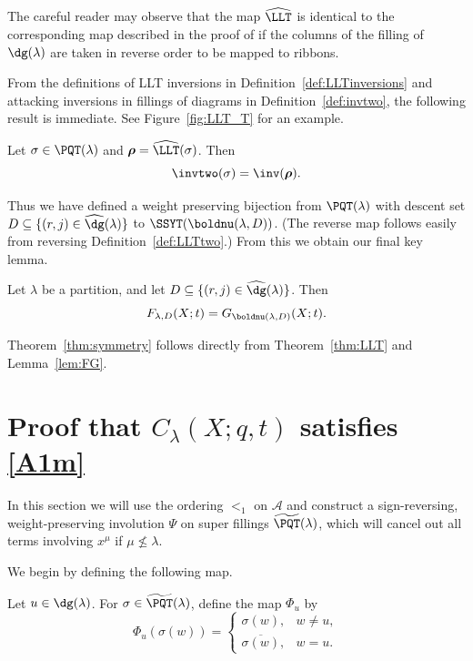 \begin{remark}
The careful reader may observe that the map $\widehat{\LLT}$ is identical to the corresponding map described in the proof of \cite[Proposition 3.4]{HHL05} if the columns of the filling of $\dg(\lambda)$ are taken in reverse order to be mapped to ribbons.
\end{remark}

From the definitions of LLT inversions in Definition~\ref{def:LLTinversions} and attacking inversions in fillings of diagrams in Definition~\ref{def:invtwo}, the following result is immediate. See Figure~\ref{fig:LLT_T} for an example.

\begin{lemma}\label{lem:LLTtwo}
Let $\sigma\in\PQT(\lambda)$ and $\boldsymbol{\rho}=\widehat{\LLT}(\sigma)$. Then
\[
\invtwo(\sigma) = \inv(\boldsymbol{\rho}).
\]
\end{lemma}


Thus we have defined a weight preserving bijection from $\PQT(\lambda)$ with descent set $D \subseteq \{(r,j) \in \widehat{\dg}(\lambda)\}$ to $\SSYT(\boldnu(\lambda,D))$. (The reverse map follows easily from reversing Definition~\ref{def:LLTtwo}.) From this we obtain our final key lemma.

\begin{lemma}\label{lem:FG}
Let $\lambda$ be a partition, and let $D \subseteq \{(r,j) \in \widehat{\dg}(\lambda)\}$. Then
\[
F_{\lambda,D}(X;t) = G_{\boldnu(\lambda,D)}(X;t).
\]
\end{lemma}

Theorem~\ref{thm:symmetry} follows directly from Theorem~\ref{thm:LLT} and Lemma~\ref{lem:FG}.







\section{Proof that $C_{\lambda}(X;q,t)$ satisfies \eqref{A1m}}
\label{sec:A1m}

In this section we will use the ordering $<_1$ on $\mathcal{A}$ and construct a sign-reversing, weight-preserving involution $\Psi$ on super fillings $\widetilde{\PQT}(\lambda)$, which will cancel out all terms involving $x^{\mu}$ if $\mu \not\leq \lambda$. 

We begin by defining the following map.

\begin{defn}\label{def:Phi_u} 
Let $u\in\dg(\lambda)$. For $\sigma\in\widetilde{\PQT}(\lambda)$, define the map $\Phi_u$ by
\[
\Phi_u(\sigma(w))=\begin{cases} \sigma(w),& w \neq u,\\[0.2cm]
\overline{\sigma(w)},& w=u.
\end{cases}
\]
\end{defn} 

